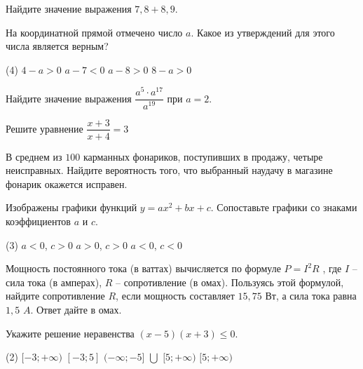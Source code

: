\begin{class}[number=9]
	\begin{listofex}
\item Найдите значение выражения \( 7,8 + 8,9 \).
\item На координатной прямой отмечено число \( a \). Какое из утверждений для этого числа
является верным?
\begin{figure}[h]
\end{figure}
\begin{tasks}(4)
	\task \( 4 - a > 0 \)
	\task \( a-7 < 0 \)
	\task \( a-8 > 0 \)
	\task \( 8 - a > 0 \)
\end{tasks}
\item Найдите значение выражения \( \dfrac{a^{5}\cdot a^{17}}{a^{19}} \) при \( a=2 \).
\item Решите уравнение \( \dfrac{x+3}{x+4}=3 \)
\item В среднем из \( 100 \) карманных фонариков, поступивших в продажу, четыре
неисправных. Найдите вероятность того, что выбранный наудачу в магазине
фонарик окажется исправен.
\item Изображены графики функций \( y = ax^{2} + bx + c \). Сопоставьте графики со знаками
коэффициентов \( a \) и \( c \).
\begin{figure}[h]
\end{figure}
\begin{tasks}(3)
	\task \( a<0 \), \( c>0 \)
	\task \( a>0 \), \( c>0 \)
	\task \( a<0 \), \( c<0 \)
\end{tasks}
\item Мощность постоянного тока (в ваттах) вычисляется по формуле \( P = I^{2}R \) , где \( I \) – сила тока (в амперах), \( R \) – сопротивление (в омах). Пользуясь этой формулой, найдите сопротивление \( R \), если мощность составляет \( 15,75 \) Вт, а сила тока равна \( 1,5 \) \( A \). Ответ дайте в омах.
\item Укажите решение неравенства \( (x-5)(x+3)\leq0 \).
\begin{tasks}(2)
	\task \( [-3;+\infty) \)
	\task \( [-3;5] \)
	\task \( (-\infty;-5] \) \( \bigcup \) \( [5;+\infty) \)
	\task \( [5;+\infty) \)
\end{tasks}

\end{listofex}
\end{class}
